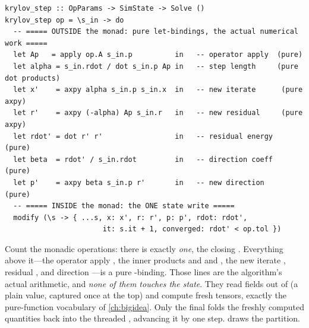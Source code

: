 \begin{lstlisting}[style=l4style]
krylov_step :: OpParams -> SimState -> Solve ()
krylov_step op = \s_in -> do
  -- ===== OUTSIDE the monad: pure let-bindings, the actual numerical work =====
  let Ap   = apply op.A s_in.p          in   -- operator apply  (pure)
  let alpha = s_in.rdot / dot s_in.p Ap in   -- step length     (pure dot products)
  let x'    = axpy alpha s_in.p s_in.x  in   -- new iterate      (pure axpy)
  let r'    = axpy (-alpha) Ap s_in.r   in   -- new residual     (pure axpy)
  let rdot' = dot r' r'                 in   -- residual energy  (pure)
  let beta  = rdot' / s_in.rdot         in   -- direction coeff  (pure)
  let p'    = axpy beta s_in.p r'       in   -- new direction    (pure)
  -- ===== INSIDE the monad: the ONE state write =====
  modify (\s -> { ...s, x: x', r: r', p: p', rdot: rdot',
                       it: s.it + 1, converged: rdot' < op.tol })
\end{lstlisting}

\noindent Count the monadic operations: there is exactly \emph{one}, the closing
. Everything above it---the operator apply , the inner products
 and  and , the new iterate , residual
, and direction ---is a pure -binding. Those lines are the
algorithm's actual arithmetic, and \emph{none of them touches the state}. They read
fields out of  (a plain value, captured once at the top) and compute fresh
tensors, exactly the pure-function vocabulary of \cref{ch:bigidea}. Only the final
 folds the freshly computed quantities back into the threaded
, advancing it by one step.  draws the partition.

